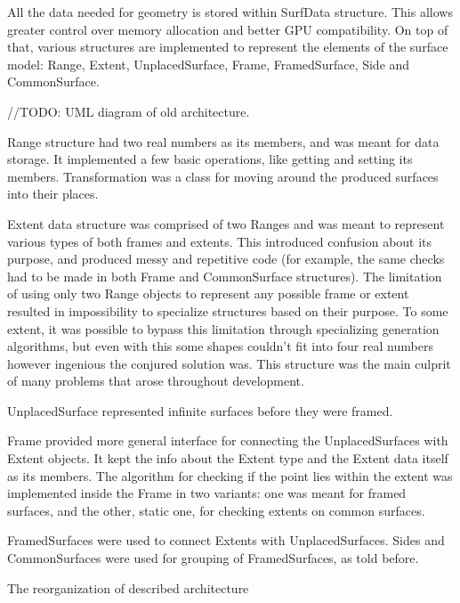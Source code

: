 \documentclass[12pt, a4paper]{article}
\begin{document}
All the data needed for geometry is stored within SurfData structure. This allows greater control over memory allocation and better GPU compatibility. On top of that, various structures are implemented to represent the elements of the surface model: Range, Extent, UnplacedSurface, Frame, FramedSurface, Side and CommonSurface.

//TODO: UML diagram of old architecture.

Range structure had two real numbers as its members, and was meant for data storage. It implemented a few basic operations, like getting and setting its members. Transformation was a class for moving around the produced surfaces into their places.

Extent data structure was comprised of two Ranges and was meant to represent various types of both frames and extents. This introduced confusion about its purpose, and produced messy and repetitive code (for example, the same checks had to be made in both Frame and CommonSurface structures). The limitation of using only two Range objects to represent any possible frame or extent resulted in impossibility to specialize structures based on their purpose. To some extent, it was possible to bypass this limitation through specializing generation algorithms, but even with this some shapes couldn't fit into four real numbers however ingenious the conjured solution was. This structure was the main culprit of many problems that arose throughout development.

UnplacedSurface represented infinite surfaces before they were framed.

Frame provided more general interface for connecting the UnplacedSurfaces with Extent objects. It kept the info about the Extent type and the Extent data itself as its members. The algorithm for checking if the point lies within the extent was implemented inside the Frame in two variants: one was meant for framed surfaces, and the other, static one, for checking extents on common surfaces.

FramedSurfaces were used to connect Extents with UnplacedSurfaces. Sides and CommonSurfaces were used for grouping of FramedSurfaces, as told before.

The reorganization of described architecture 
\end{document}
